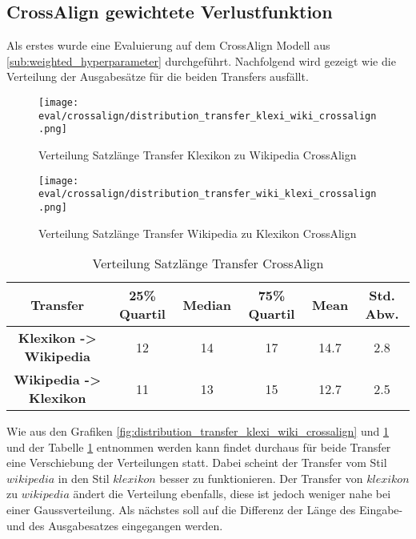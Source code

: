 \subsection{CrossAlign gewichtete Verlustfunktion}
\label{sec:eval-weighted-loss}

Als erstes wurde eine Evaluierung auf dem CrossAlign Modell aus \ref{sub:weighted_hyperparameter} durchgeführt.
Nachfolgend wird gezeigt wie die Verteilung der Ausgabesätze für die beiden Transfers ausfällt.

\begin{figure}[H]
      \texttt{[image: eval/crossalign/distribution\_transfer\_klexi\_wiki\_crossalign.png]}
      \caption{Verteilung Satzlänge Transfer Klexikon zu Wikipedia CrossAlign}\label{fig:distribution_transfer_klexi_wiki_crossalign}
    \endminipage\hfill
      \texttt{[image: eval/crossalign/distribution\_transfer\_wiki\_klexi\_crossalign.png]}
      \caption{Verteilung Satzlänge Transfer Wikipedia zu Klexikon CrossAlign}\label{fig:distribution_transfer_wiki_klexi_crossalign}
    \endminipage\hfill       
 \end{figure}
 \begin{table}[H]
    \centering
    \begin{tabular}{|c|c|c|c|c|c|}
      \hline
      \textbf{Transfer}& \textbf{25\% Quartil}& \textbf{Median}& \textbf{75\% Quartil} & \textbf{Mean} &
      \textbf{Std. Abw.}\\
      \hline
      \textbf{Klexikon -> Wikipedia}& 12 & 14 & 17 & 14.7 & 2.8\\
      \hline
      \textbf{Wikipedia -> Klexikon}& 11 & 13 & 15 & 12.7 & 2.5\\
      \hline
    \end{tabular}
    \caption{Verteilung Satzlänge Transfer CrossAlign}
    \label{tab:distribution_transfer_crossalign}
  \end{table} 
\noindent
\newline
Wie aus den Grafiken \ref{fig:distribution_transfer_klexi_wiki_crossalign} und
\ref{fig:distribution_transfer_wiki_klexi_crossalign} und der Tabelle \ref{tab:distribution_transfer_crossalign}
entnommen werden kann findet durchaus für beide Transfer eine Verschiebung der Verteilungen statt. Dabei scheint der
Transfer vom Stil $ wikipedia $ in den Stil $ klexikon $ besser zu funktionieren. Der Transfer von $ klexikon $ zu $
wikipedia $ ändert die Verteilung ebenfalls, diese ist jedoch weniger nahe bei einer Gaussverteilung.
\newline
\newline
Als nächstes soll auf die Differenz der Länge des Eingabe- und des Ausgabesatzes eingegangen werden.

